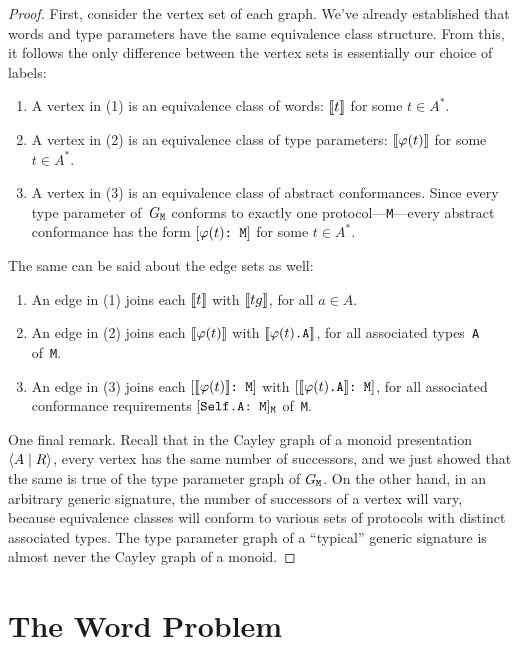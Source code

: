 \documentclass[../generics]{subfiles}
\begin{document}
\begin{proof}
First, consider the vertex set of each graph. We've already established that words and type parameters have the same equivalence class structure. From this, it follows the only difference between the vertex sets is essentially our choice of labels:
\begin{enumerate}
\item A vertex in (1) is an equivalence class of words: $[\![t]\!]$ for some $t\in A^*$.
\item A vertex in (2) is an equivalence class of type parameters: $[\![\varphi(t)]\!]$ for some $t\in A^*$.
\item A vertex in (3) is an equivalence class of abstract conformances. Since every type parameter of~$G_\texttt{M}$ conforms to exactly one protocol---\texttt{M}---every abstract conformance has the form $[\texttt{$\varphi(t)$:~M}]$ for some $t\in A^*$.
\end{enumerate}
The same can be said about the edge sets as well:
\begin{enumerate}
\item An edge in (1) joins each $[\![t]\!]$ with $[\![tg]\!]$, for all $a\in A$.
\item An edge in (2) joins each $[\![\varphi(t)]\!]$ with $[\![\varphi(t)\texttt{.A}]\!]$, for all associated types~\texttt{A} of~\texttt{M}.
\item An edge in (3) joins each $[\texttt{$[\![\varphi(t)]\!]$:~M}]$ with $[\texttt{$[\![\varphi(t)\texttt{.A}]\!]$:~M}]$, for all associated conformance requirements $[\texttt{Self.A:~M}]_{\texttt{M}}$ of~\texttt{M}.
\end{enumerate}

One final remark. Recall that in the Cayley graph of a monoid presentation~$\langle A \mid R\rangle$, every vertex has the same number of successors, and we just showed that the same is true of the type parameter graph of $G_\texttt{M}$. On the other hand, in an arbitrary generic signature, the number of successors of a vertex will vary, because equivalence classes will conform to various sets of protocols with distinct associated types. The type parameter graph of a ``typical'' generic signature is almost never the Cayley graph of a monoid.
\end{proof}

\section{The Word Problem}\label{sec:word problem}
\end{document}
